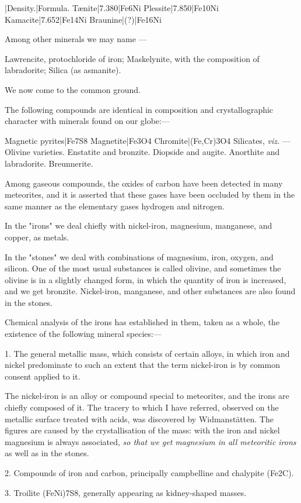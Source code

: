 \documentclass[a4paper, 12pt, oneside, polutonikogreek, english]{article}
\begin{document}
|Density.|Formula. 
Tænite|7.380|Fe6Ni 
Plessite|7.850|Fe10Ni 
Kamacite|7.652|Fe14Ni 
Braunine|(?)|Fe16Ni 

Among other minerals we may name ---

Lawrencite, protochloride of iron; 
Maskelynite, with the composition of labradorite; 
Silica (as asmanite).

We now come to the common ground.

The following compounds are identical in composition and crystallographic character with minerals found on our globe:---

Magnetic pyrites|Fe7S8 
Magnetite|Fe3O4 
Chromite|(Fe,Cr)3O4 
Silicates, \emph{viz.} --- 
Olivine varieties. 
Enstatite and bronzite. 
Diopside and augite. 
Anorthite and labradorite. 
Breunnerite.

Among gaseous compounds, the oxides of carbon have been detected in many meteorites, and it is asserted that these gases have been occluded by them in the same manner as the elementary gases hydrogen and nitrogen.

In the "irons" we deal chiefly with nickel-iron, magnesium, manganese, and copper, as metals.

In the "stones" we deal with combinations of magnesium, iron, oxygen, and silicon. One of the most usual substances is called olivine, and sometimes the olivine is in a slightly changed form, in which the quantity of iron is increased, and we get bronzite. Nickel-iron, manganese, and other substances are also found in the stones.

Chemical analysis of the irons has established in them, taken as a whole, the existence of the following mineral species:---

1. The general metallic mass, which consists of certain alloys, in which iron and nickel predominate to such an extent that the term nickel-iron is by common consent applied to it.

The nickel-iron is an alloy or compound special to meteorites, and the irons are chiefly composed of it. The tracery to which I have referred, observed on the metallic surface treated with acids, was discovered by Widmanstätten. The figures are caused by the crystallisation of the mass: with the iron and nickel magnesium is always associated, \emph{so that we get magnesium in all meteoritic irons} as well as in the stones.

2. Compounds of iron and carbon, principally campbelline and chalypite (Fe2C).

3. Troilite (FeNi)7S8, generally appearing as kidney-shaped masses.
\end{document}
